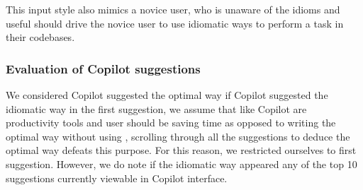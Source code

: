 This input style also mimics a novice user, who is unaware of the idioms and useful \cct{} should drive the novice user to use idiomatic ways to perform a task in their codebases.

\subsubsection{Evaluation of Copilot suggestions}
\label{evaluation}
We considered Copilot suggested the optimal way if Copilot suggested the idiomatic way in the first suggestion, we assume that \cct{} like Copilot are productivity tools and user should be saving time as opposed to writing the optimal way without using \cct{}, scrolling through all the suggestions to deduce the optimal way defeats this purpose. For this reason, we restricted ourselves to first suggestion. However, we do note if the idiomatic way appeared any of the top 10 suggestions currently viewable in Copilot interface. 


